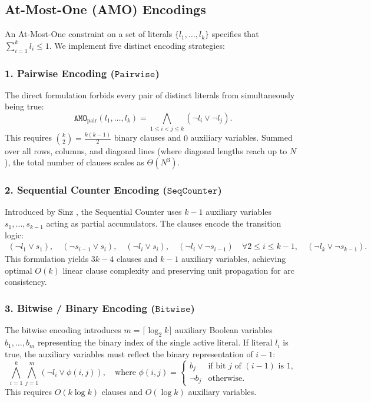 \documentclass[a4paper,fleqn]{cas-sc}
\begin{document}
\subsection{At-Most-One (AMO) Encodings}
An At-Most-One constraint on a set of literals $\{l_1, \dots, l_k\}$ specifies that $\sum_{i=1}^k l_i \le 1$. We implement five distinct encoding strategies:

\subsubsection{1. Pairwise Encoding ($\mathtt{Pairwise}$)}
The direct formulation forbids every pair of distinct literals from simultaneously being true:
\begin{equation}
    \mathtt{AMO}_{\text{pair}}(l_1, \dots, l_k) = \bigwedge_{1 \le i < j \le k} (\neg l_i \lor \neg l_j).
\end{equation}
This requires $\binom{k}{2} = \frac{k(k-1)}{2}$ binary clauses and $0$ auxiliary variables. Summed over all rows, columns, and diagonal lines (where diagonal lengths reach up to $N$), the total number of clauses scales as $\Theta(N^3)$.

\subsubsection{2. Sequential Counter Encoding ($\mathtt{SeqCounter}$)}
Introduced by Sinz \citep{sinz2005towards}, the Sequential Counter uses $k-1$ auxiliary variables $s_1, \dots, s_{k-1}$ acting as partial accumulators. The clauses encode the transition logic:
\begin{align}
    (\neg l_1 \lor s_1), \quad (\neg s_{i-1} \lor s_i), \quad (\neg l_i \lor s_i), \quad (\neg l_i \lor \neg s_{i-1}) \quad \forall 2 \le i \le k-1, \quad (\neg l_k \lor \neg s_{k-1}).
\end{align}
This formulation yields $3k - 4$ clauses and $k-1$ auxiliary variables, achieving optimal $O(k)$ linear clause complexity and preserving unit propagation for arc consistency.

\subsubsection{3. Bitwise / Binary Encoding ($\mathtt{Bitwise}$)}
The bitwise encoding introduces $m = \lceil \log_2 k \rceil$ auxiliary Boolean variables $b_1, \dots, b_m$ representing the binary index of the single active literal. If literal $l_i$ is true, the auxiliary variables must reflect the binary representation of $i-1$:
\begin{equation}
    \bigwedge_{i=1}^k \bigwedge_{j=1}^m \left( \neg l_i \lor \phi(i, j) \right), \quad \text{where } \phi(i, j) = \begin{cases} b_j & \text{if bit } j \text{ of } (i-1) \text{ is } 1, \\ \neg b_j & \text{otherwise.} \end{cases}
\end{equation}
This requires $O(k \log k)$ clauses and $O(\log k)$ auxiliary variables.
\end{document}
